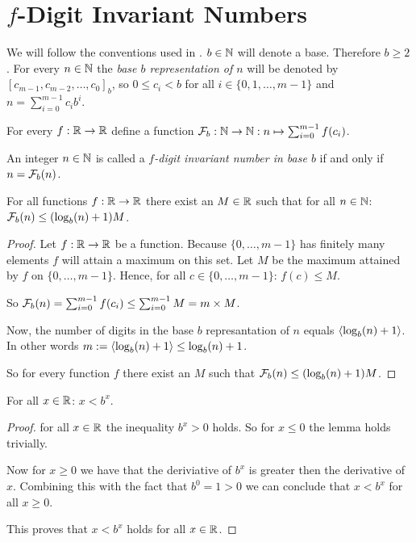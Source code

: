 \section*{$f$-Digit Invariant Numbers}

We will follow the conventions used in \cite{dvb}. $b\in\mathbb{N}$ will denote a base.
Therefore $b \ge 2$. For every $n \in \mathbb{N}$ the \emph{base $b$ representation
of $n$} will be denoted by $[c_{m-1}, c_{m-2}, \ldots, c_{0}]_{b}$, so 
$0 \le c_{i} < b$ for all $i \in \{0,1,\ldots,m-1\}$ and 
$n = \sum_{i=0}^{m-1} c_{i}b^{i}$.

For every $f : \mathbb{R} \rightarrow \mathbb{R}$ define a function $\mathcal{F}_{b} : \mathbb{N} \rightarrow
\mathbb{N} : n \mapsto \sum_{i=0}^{m-1} f(c_{i})$.

\begin{definition}
	An integer $n \in \mathbb{N}$ is called a \emph{$f$-digit invariant number in base
	$b$} if and only if $n = \mathcal{F}_{b}(n)$.
\end{definition}

\begin{proposition}
	For all functions $f : \mathbb{R} \rightarrow \mathbb{R}$ there exist an 
	$M \in \mathbb{R}$ such that for all $n \in \mathbb{N}$: $\mathcal{F}_{b}(n) \le (\log_{b}(n) + 1) M$.
\end{proposition}

\begin{proof}
	Let $f : \mathbb{R} \rightarrow \mathbb{R}$ be a function. Because $\{0,\ldots,m-1\}$ has 
	finitely many elements $f$ will attain a maximum on this set. Let $M$ be the
	maximum	attained by $f$ on $\{0,\ldots,m-1\}$. Hence, for all 
	$c \in \{0,\ldots,m-1\}$: $f(c) \le M$.
	
	So $\mathcal{F}_{b}(n) = \sum_{i=0}^{m-1} f(c_{i}) \le 
	\sum_{i=0}^{m-1} M = m \times M$.
	
	Now, the number of digits in the base $b$ represantation of $n$ equals 
	$\langle\log_{b}(n) + 1\rangle$. In other words $m := \langle\log_{b}(n) + 1\rangle 
	\le \log_{b}(n) + 1$.
	
	So for every function $f$ there exist an $M$ such that 
	$\mathcal{F}_{b}(n) \le (\log_{b}(n) + 1) M$.
\end{proof}

\begin{lemma}
	For all $x \in \mathbb{R}$: $x < b^{x}$.
\end{lemma}

\begin{proof}
	for all $x \in \mathbb{R}$ the inequality $b^{x} \gt 0$ holds. So for $x \le 0$ the
	lemma holds trivially.
	
	Now for $x \ge 0$ we have that the deriviative of $b^{x}$ is greater then
	the derivative of $x$. Combining this with the fact that $b^{0} = 1 > 0$ we
	can conclude that $x \lt b^{x}$ for all $x \ge 0$.
	
	This proves that $x < b^{x}$ holds for all $x \in \mathbb{R}$.
\end{proof}

